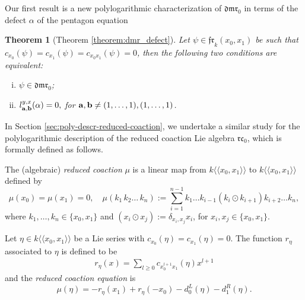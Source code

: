 \documentclass[a4paper,fleqn]{cas-sc}
\newtheorem{theorem}{Theorem}
\newcommand{\kk}{k\langle \langle x_0, x_1 \rangle \rangle}
\begin{document}
Our first result is a new polylogarithmic characterization of $\mathfrak{dmr}_0$ in terms of the defect $\alpha$ %
of the pentagon equation  

\renewcommand{\thetheorem}{\Alph{theorem}}
\setcounter{theorem}{0}
\begin{theorem}[Theorem \ref{theorem:dmr_defect}] \label{theorem:dmr_defect-B}
	Let $\psi\in \mathfrak{fr}_k(x_0,x_1)$ be such that $c_{x_0}(\psi)=c_{x_1}(\psi)= c_{x_0 x_1}(\psi)=0$, then the following two conditions are equivalent:
	\begin{enumerate}[(i)] %
		\item $\psi\in \mathfrak{dmr}_0$;
		\item $l^{y,x}_{\bf{a},\bf{b}}(\alpha)=0,$ for ${\bf{a},\bf{b}}\ne (1,\dots,1),(1,\dots,1)$.
	\end{enumerate}
\end{theorem}

In Section \ref{sec:poly-descr-reduced-coaction}, we undertake a similar study for the polylogarithmic description of the reduced coaction Lie algebra $\mathfrak{rc}_0$, which is formally defined as follows.

\begin{definition}
The (algebraic) \textit{reduced coaction} $\mu$ is a linear map from $k\langle\langle x_0,x_1\rangle\rangle$ to $k\langle\langle x_0,x_1\rangle\rangle$ defined by
\begin{equation}\label{eq:reduced_coaction}
           \mu(x_0)=\mu(x_1)=0, \quad
           \mu(k_1\,k_2\dots\, k_n):=\sum^{n-1}_{i=1}k_1\dots k_{i-1}(k_i\odot k_{i+1})k_{i+2}\dots k_n,
\end{equation}
where $k_1,\dots,k_n\in \{x_0,x_1\}$ and $(x_i\odot x_{j}):=\delta_{x_i,x_j}x_i$, for $x_i,x_j\in \{x_0,x_1\}$.
\end{definition}


\begin{definition}
	Let $\eta \in \kk$ be a Lie series 
    with $c_{x_0}(\eta)=c_{x_1}(\eta)=0$. The function $r_{\eta}$ associated to $\eta$ is defined to be
\begin{align*}
		r_{\eta}(x)=\sum_{l\ge 0}c_{x^{l+1}_0x_1}(\eta)x^{l+1}
\end{align*}
	and the \textit{reduced coaction equation} is %
	\begin{equation}\label{reduced_coaction_equation}
		\mu(\eta)=-r_{\eta}(x_1)+r_{\eta}(-x_0)-d_0^L(\eta)-d_1^R(\eta).
	\end{equation}
\end{definition}
\end{document}
